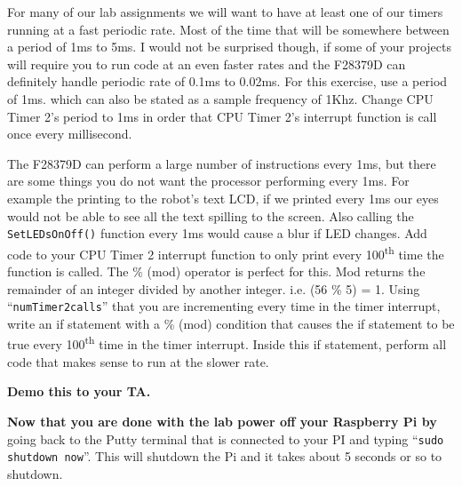 \documentclass[11pt]{article}
\begin{document}
For many of our lab assignments we will want to have at least one of our timers running at a fast periodic rate. Most of the time that will be somewhere between a period of 1ms to 5ms. I would not be surprised though, if some of your projects will require you to run code at an even faster rates and the F28379D can definitely handle periodic rate of 0.1ms to 0.02ms. For this exercise, use a period of 1ms. which can also be stated as a sample frequency of 1Khz. Change CPU Timer 2’s period to 1ms in order that CPU Timer 2’s interrupt function is call once every millisecond.

The F28379D can perform a large number of instructions every 1ms, but there are some things you do not want the processor performing every 1ms. For example the printing to the robot’s text LCD, if we printed every 1ms our eyes would not be able to see all the text spilling to the screen. Also calling the \texttt{SetLEDsOnOff()} function every 1ms would cause a blur if LED changes. Add code to your CPU Timer 2 interrupt function to only print every 100\textsuperscript{th} time the function is called. The \% (mod) operator is perfect for this. Mod returns the remainder of an integer divided by another integer. i.e. (56 \% 5) = 1. Using “\texttt{numTimer2calls}” that you are incrementing every time in the timer interrupt, write an if statement with a \% (mod) condition that causes the if statement to be true every 100\textsuperscript{th} time in the timer interrupt. Inside this if statement, perform all code that makes sense to run at the slower rate.
%
\begin{checkoff}
        \textbf{Demo this to your TA.}
\end{checkoff}
%
\textbf{Now that you are done with the lab power off your Raspberry Pi by} going back to the Putty terminal that is connected to your PI and typing “\lstinline|sudo shutdown now|”. This will shutdown the Pi and it takes about 5 seconds or so to shutdown.
\end{document}
